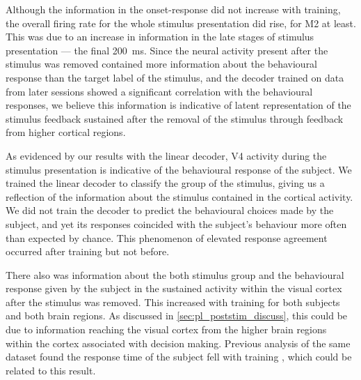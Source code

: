 Although the information in the onset-response did not increase with training, the overall firing rate for the whole stimulus presentation did rise, for \ac{M2} at least.
This was due to an increase in information in the late stages of stimulus presentation --- the final \SI{200}{\milli\second}.
Since the neural activity present after the stimulus was removed contained more information about the behavioural response than the target label of the stimulus, and the decoder trained on data from later sessions showed a significant correlation with the behavioural responses, we believe this information is indicative of latent representation of the stimulus feedback sustained after the removal of the stimulus through feedback from higher cortical regions.

As evidenced by our results with the linear decoder, \ac{V4} activity during the stimulus presentation is indicative of the behavioural response of the subject.
We trained the linear decoder to classify the group of the stimulus, giving us a reflection of the information about the stimulus contained in the cortical activity.
We did not train the decoder to predict the behavioural choices made by the subject, and yet its responses coincided with the subject's behaviour more often than expected by chance.
This phenomenon of elevated response agreement occurred after training but not before.

There also was information about the both stimulus group and the behavioural response given by the subject in the sustained activity within the visual cortex after the stimulus was removed.
This increased with training for both subjects and both brain regions.
As discussed in \autoref{sec:pl_poststim_discuss}, this could be due to information reaching the visual cortex from the higher brain regions within the cortex associated with decision making.
Previous analysis of the same dataset found the response time of the subject fell with training \citep{Chen2013,Chen2013thesis}, which could be related to this result.

